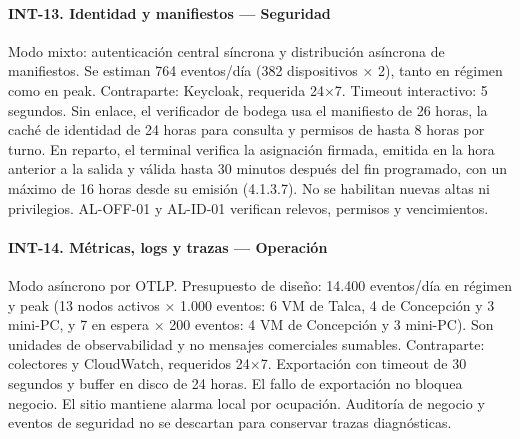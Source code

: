 \paragraph{INT-13. Identidad y manifiestos — Seguridad}
Modo mixto: autenticación central síncrona y distribución asíncrona de manifiestos. Se estiman 764 eventos/día (382 dispositivos × 2), tanto en régimen como en peak. Contraparte: Keycloak, requerida 24$\times$7. Timeout interactivo: 5 segundos. Sin enlace, el verificador de bodega usa el manifiesto de 26 horas, la caché de identidad de 24 horas para consulta y permisos de hasta 8 horas por turno. En reparto, el terminal verifica la asignación firmada, emitida en la hora anterior a la salida y válida hasta 30 minutos después del fin programado, con un máximo de 16 horas desde su emisión (4.1.3.7). No se habilitan nuevas altas ni privilegios. AL-OFF-01 y AL-ID-01 verifican relevos, permisos y vencimientos.

\paragraph{INT-14. Métricas, logs y trazas — Operación}
Modo asíncrono por OTLP. Presupuesto de diseño: 14.400 eventos/día en régimen y peak (13 nodos activos × 1.000 eventos: 6 VM de Talca, 4 de Concepción y 3 mini-PC, y 7 en espera × 200 eventos: 4 VM de Concepción y 3 mini-PC). Son unidades de observabilidad y no mensajes comerciales sumables. Contraparte: colectores y CloudWatch, requeridos 24$\times$7. Exportación con timeout de 30 segundos y buffer en disco de 24 horas. El fallo de exportación no bloquea negocio. El sitio mantiene alarma local por ocupación. Auditoría de negocio y eventos de seguridad no se descartan para conservar trazas diagnósticas.


\label{fuente-08-anexo-4-1-g-catalogo-de-interfaces-internas-fin}
